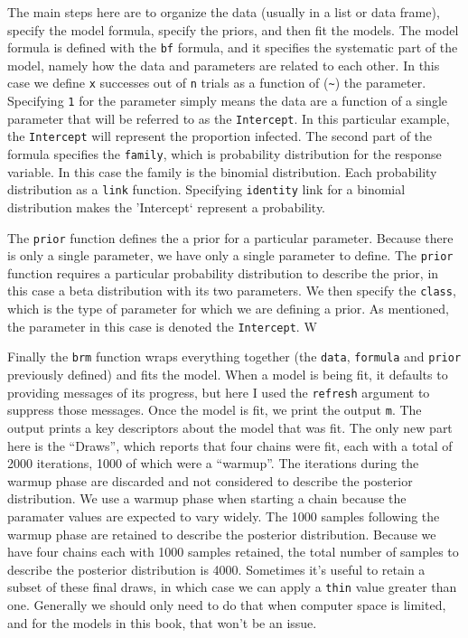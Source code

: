 \documentclass[
]{book}
\begin{document}
The main steps here are to organize the data (usually in a list or data
frame), specify the model formula, specify the priors, and then fit the
models. The model formula is defined with the \texttt{bf} formula, and it
specifies the systematic part of the model, namely how the data and
parameters are related to each other. In this case we define \texttt{x}
successes out of \texttt{n} trials as a function of (\texttt{\textasciitilde{}}) the parameter.
Specifying \texttt{1} for the parameter simply means the data are a function of
a single parameter that will be referred to as the \texttt{Intercept}. In this
particular example, the \texttt{Intercept} will represent the proportion
infected. The second part of the formula specifies the \texttt{family}, which
is probability distribution for the response variable. In this case the
family is the binomial distribution. Each probability distribution as a
\texttt{link} function. Specifying \texttt{identity} link for a binomial distribution
makes the 'Intercept` represent a probability.

The \texttt{prior} function defines the a prior for a particular parameter.
Because there is only a single parameter, we have only a single
parameter to define. The \texttt{prior} function requires a particular
probability distribution to describe the prior, in this case a beta
distribution with its two parameters. We then specify the \texttt{class}, which
is the type of parameter for which we are defining a prior. As
mentioned, the parameter in this case is denoted the \texttt{Intercept}. W

Finally the \texttt{brm} function wraps everything together (the \texttt{data},
\texttt{formula} and \texttt{prior} previously defined) and fits the model. When a
model is being fit, it defaults to providing messages of its progress,
but here I used the \texttt{refresh} argument to suppress those messages. Once
the model is fit, we print the output \texttt{m}. The output prints a key
descriptors about the model that was fit. The only new part here is the
``Draws'', which reports that four chains were fit, each with a total of
2000 iterations, 1000 of which were a ``warmup''. The iterations during
the warmup phase are discarded and not considered to describe the
posterior distribution. We use a warmup phase when starting a chain
because the paramater values are expected to vary widely. The 1000
samples following the warmup phase are retained to describe the
posterior distribution. Because we have four chains each with 1000
samples retained, the total number of samples to describe the posterior
distribution is 4000. Sometimes it's useful to retain a subset of these
final draws, in which case we can apply a \texttt{thin} value greater than one.
Generally we should only need to do that when computer space is limited,
and for the models in this book, that won't be an issue.
\end{document}
